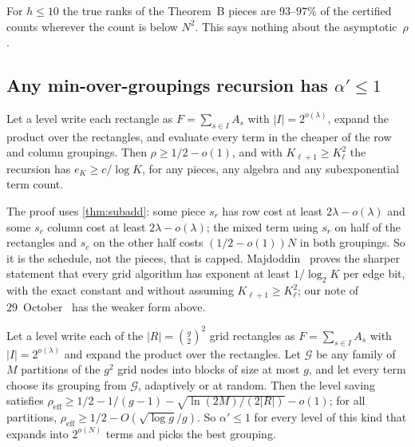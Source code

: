 \documentclass[10pt]{amsart}
\theoremstyle{plain}
\theoremstyle{definition}
\theoremstyle{remark}
\numberwithin{equation}{section}
\begin{document}
\begin{remark}\label{rem:fockranks}
For $h\le10$ the true ranks of the Theorem~B pieces are $93$--$97\%$ of the certified counts wherever
the count is below $N^2$. This says nothing about the asymptotic~$\rho$.
\end{remark}

\subsection{Any min-over-groupings recursion has \texorpdfstring{$\alpha'\le1$}{alpha' <= 1}}\label{sec:groupings}
\begin{proposition}\label{prop:twogroup}
Let a level write each rectangle as $F=\sum_{s\in I}A_s$ with $|I|=2^{o(\lambda)}$, expand the product
over the rectangles, and evaluate every term in the cheaper of the row and column groupings. Then
$\rho\ge1/2-o(1)$, and with $K_{\ell+1}\ge K_\ell^2$ the recursion has $e_K\ge c/\log K$, for any
pieces, any algebra and any subexponential term count.
\end{proposition}

\noindent The proof uses \cref{thm:subadd}: some piece $s_r$ has row cost at least $2\lambda-o(\lambda)$
and some $s_c$ column cost at least $2\lambda-o(\lambda)$; the mixed term using $s_r$ on half of the
rectangles and $s_c$ on the other half costs $(1/2-o(1))N$ in both groupings. So it is the schedule,
not the pieces, that is capped. Majdoddin~\cite[Theorem~4.13 and Corollary~4.19]{Maj26} proves the
sharper statement that every grid algorithm has exponent at least $1/\log_2K$ per edge bit, with the
exact constant and without assuming $K_{\ell+1}\ge K_\ell^2$; our note of 29~October~\cite{TulsyanRepo26}
has the weaker form above.

\begin{proposition}\label{prop:covering}
Let a level write each of the $|R|=\binom g2^2$ grid rectangles as $F=\sum_{s\in I}A_s$ with
$|I|=2^{o(\lambda)}$ and expand the product over the rectangles. Let $\mathcal G$ be any family of $M$
partitions of the $g^2$ grid nodes into blocks of size at most $g$, and let every term choose its
grouping from $\mathcal G$, adaptively or at random. Then the level saving satisfies
$\rho_{\mathrm{eff}}\ge1/2-1/(g-1)-\sqrt{\ln(2M)/(2|R|)}-o(1)$; for all partitions,
$\rho_{\mathrm{eff}}\ge1/2-O(\sqrt{\log g}/g)$. So $\alpha'\le1$ for every level of this kind that
expands into $2^{o(N)}$ terms and picks the best grouping.
\end{proposition}
\end{document}
